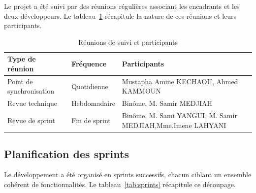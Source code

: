 Le projet a été suivi par des réunions régulières associant les encadrants et les deux développeurs. Le tableau~\ref{tab:reunions} récapitule la nature de ces réunions et leurs participants.

\begin{table}[H]
    \centering
    \caption{Réunions de suivi et participants}
    \label{tab:reunions}
    \begin{tabular}{p{4cm}p{3cm}p{6.5cm}}
        \toprule
        \textbf{Type de réunion} & \textbf{Fréquence} & \textbf{Participants} \\
        \midrule
        Point de synchronisation & Quotidienne & Mustapha Amine KECHAOU, Ahmed KAMMOUN \\
        Revue technique & Hebdomadaire & Binôme, M. Samir MEDJIAH \\
        Revue de sprint & Fin de sprint & Binôme, M. Sami YANGUI, M. Samir MEDJIAH,Mme.Imene LAHYANI \\
        \bottomrule
    \end{tabular}
\end{table}

\subsection{Planification des sprints}

Le développement a été organisé en sprints successifs, chacun ciblant un ensemble cohérent de fonctionnalités. Le tableau~\ref{tab:sprints} récapitule ce découpage.

